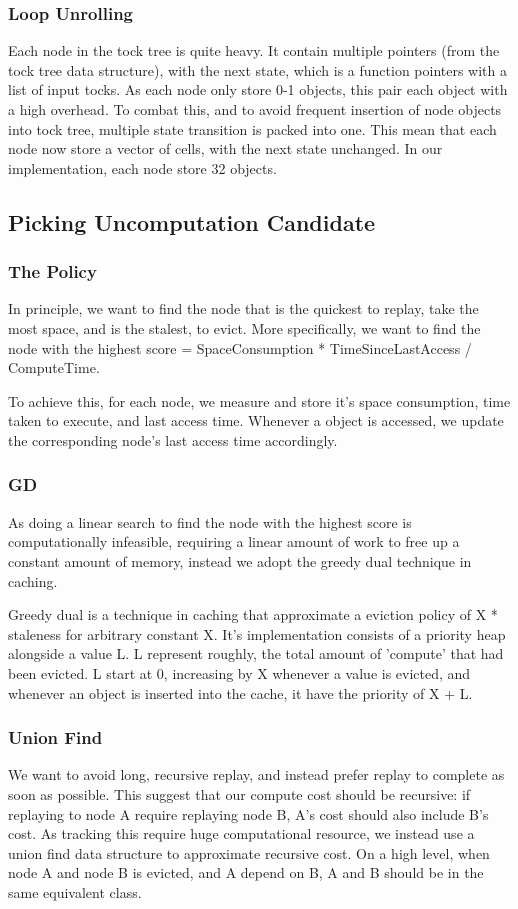 \subsubsection{Loop Unrolling}
Each node in the tock tree is quite heavy. It contain multiple pointers (from the tock tree data structure), with the next state, which is a function pointers with a list of input tocks. As each node only store 0-1 objects, this pair each object with a high overhead. To combat this, and to avoid frequent insertion of node objects into tock tree, multiple state transition is packed into one. This mean that each node now store a vector of cells, with the next state unchanged. In our implementation, each node store 32 objects.
\subsection{Picking Uncomputation Candidate}
\subsubsection{The Policy}
In principle, we want to find the node that is the quickest to replay, take the most space, and is the stalest, to evict. More specifically, we want to find the node with the highest score = SpaceConsumption * TimeSinceLastAccess / ComputeTime.

To achieve this, for each node, we measure and store it's space consumption, time taken to execute, and last access time. Whenever a object is accessed, we update the corresponding node's last access time accordingly.
\subsubsection{GD}
As doing a linear search to find the node with the highest score is computationally infeasible, requiring a linear amount of work to free up a constant amount of memory, instead we adopt the greedy dual technique in caching.

Greedy dual is a technique in caching that approximate a eviction policy of X * staleness for arbitrary constant X.
It's implementation consists of a priority heap alongside a value L.
L represent roughly, the total amount of 'compute' that had been evicted.
L start at 0, increasing by X whenever a value is evicted, and whenever an object is inserted into the cache, it have the priority of X + L.
\subsubsection{Union Find}
We want to avoid long, recursive replay, and instead prefer replay to complete as soon as possible. This suggest that our compute cost should be recursive: if replaying to node A require replaying node B, A's cost should also include B's cost. As tracking this require huge computational resource, we instead use a union find data structure to approximate recursive cost. On a high level, when node A and node B is evicted, and A depend on B, A and B should be in the same equivalent class.